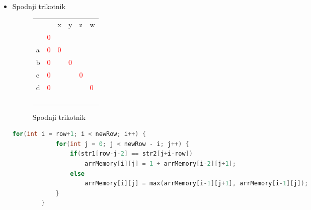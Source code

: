 \documentclass[a4paper,12pt,openright]{book}
\begin{document}
\begin{itemize}
    \item Spodnji trikotnik
    
        \begin{figure}[htb]
        \begin{center}
\begin{tabular}{|l|l|l|l|l|l|}
\cline{3-6}
  \multicolumn{2}{c|}{}  & x & y & z & w\\ \cline{2-6}
 \multicolumn{1}{c|}{} & \textcolor{red}{0} & \multicolumn{4}{c}{} \\ \cline{1-3}
a  & \textcolor{red}{0} & \textcolor{red}{0} &  \multicolumn{3}{c}{} \\ \cline{1-4}
b  & \textcolor{red}{0} &  & \textcolor{red}{0} & \multicolumn{2}{c}{} \\ \cline{1-5}
c  & \textcolor{red}{0} & \textcolor{purple}{} & \textcolor{blue}{} & \textcolor{red}{0} & \multicolumn{1}{c}{} \\ \cline{1-6}
d  & \textcolor{red}{0} & \textcolor{brown}{} & \textcolor{purple}{} & \textcolor{blue}{} & \textcolor{red}{0} \\ \hline
 \multicolumn{1}{c|}{} & \cellcolor{blue!15} & \cellcolor{blue!15} & \cellcolor{blue!15} & \cellcolor{blue!15} & \multicolumn{1}{c}{}  \\ \cline{2-5}
\multicolumn{1}{c|}{}  & \cellcolor{blue!15} & \cellcolor{blue!15} & \cellcolor{blue!15} & \multicolumn{2}{c}{}   \\ \cline{2-4}
\multicolumn{1}{c|}{}  & \cellcolor{blue!15} & \cellcolor{blue!15} &  \multicolumn{3}{c}{}   \\ \cline{2-3}
\multicolumn{1}{c|}{}  & \cellcolor{blue!15} & \multicolumn{4}{c}{}  \\ \cline{2-2}
\end{tabular}
        \end{center}
        \caption{Spodnji trikotnik}
        \label{diagMemory4}
        \end{figure}

        \begin{lstlisting}[language=C++, caption={Izračun spodnjega trikotnika za LCS}, captionpos=b, label=diagonalMemory4]
        for(int i = row+1; i < newRow; i++) {
            for(int j = 0; j < newRow - i; j++) {
                if(str1[row-j-2] == str2[j+i-row])
                    arrMemory[i][j] = 1 + arrMemory[i-2][j+1];
                else
                    arrMemory[i][j] = max(arrMemory[i-1][j+1], arrMemory[i-1][j]);
            }
        }
        \end{lstlisting}
    
\end{itemize}
\end{document}
